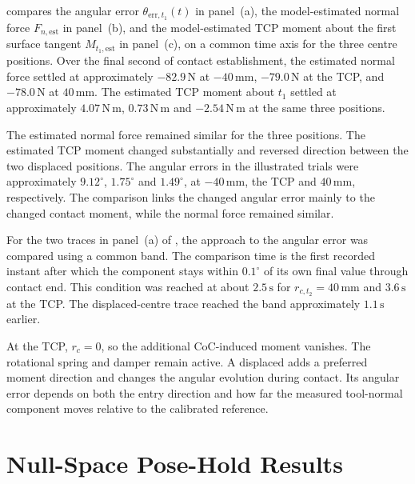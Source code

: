  compares the angular error
\mbox{\(\theta_{\mathrm{err},t_1}(t)\)} in panel~(a), the model-estimated normal force
\mbox{\(F_{n,\mathrm{est}}\)} in panel~(b), and the model-estimated TCP moment
about the first surface tangent \mbox{\(M_{t_1,\mathrm{est}}\)} in panel~(c),
on a common time axis for the three centre positions. Over the final second of
contact establishment, the estimated normal force settled at approximately
\mbox{\(-82.9\,\mathrm{N}\)} at \mbox{\(-40\,\mathrm{mm}\)},
\mbox{\(-79.0\,\mathrm{N}\)} at the TCP, and \mbox{\(-78.0\,\mathrm{N}\)} at
\mbox{\(40\,\mathrm{mm}\)}. The estimated TCP moment about \mbox{\(t_1\)}
settled at approximately \mbox{\(4.07\,\mathrm{N\,m}\)},
\mbox{\(0.73\,\mathrm{N\,m}\)} and \mbox{\(-2.54\,\mathrm{N\,m}\)} at the same
three positions.

The estimated normal force remained similar for the three 
positions. The estimated TCP moment changed substantially and reversed
direction between the two displaced positions.
The angular errors in the illustrated trials were approximately
\mbox{\(9.12^\circ\)}, \mbox{\(1.75^\circ\)} and \mbox{\(1.49^\circ\)},
at \mbox{\(-40\,\mathrm{mm}\)}, the TCP and \mbox{\(40\,\mathrm{mm}\)}, respectively.
The comparison links the changed angular error mainly to the changed contact
moment, while the normal force remained similar.

For the two traces in panel~(a) of \mbox{},
the approach to the angular error was compared using a common band.
The comparison time is the first recorded instant after which the component
stays within \mbox{\(0.1^\circ\)} of its own final value through contact end.
This condition was reached at about \mbox{\(2.5\,\mathrm{s}\)} for
\mbox{\(r_{c,t_2}=40\,\mathrm{mm}\)} and \mbox{\(3.6\,\mathrm{s}\)} at the TCP.
The displaced-centre trace reached the band approximately
\mbox{\(1.1\,\mathrm{s}\)} earlier.

At the TCP, \mbox{\(r_c=0\)}, so the additional CoC-induced moment vanishes.
The rotational spring and damper remain active.
A displaced  adds a preferred moment direction and changes the
angular evolution during contact. Its angular error depends on both the entry
direction and how far the measured tool-normal component moves relative to
the calibrated reference.

\section{Null-Space Pose-Hold Results}
\label{sec:results_nullspace}

